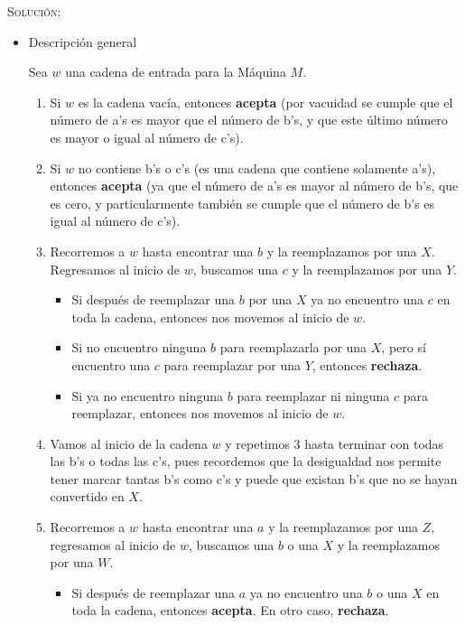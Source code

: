 \documentclass[12pt,letterpaper]{article}
\begin{document}
\begin{enumerate}[a.]
    \textsc{Solución:}
    \begin{itemize}
        \item Descripción general
        
        Sea $w$ una cadena de entrada para la Máquina $M$.
        \begin{enumerate}[1.]
            \item Si $w$ es la cadena vacía, entonces \textbf{acepta} (por vacuidad se cumple que el número de a's es mayor que el número de b's, y que este último número es mayor o igual al número de c's). 
            \item Si $w$ no contiene b's o c's (es una cadena que contiene solamente a's), entonces \textbf{acepta} (ya que el número de 
            a's es mayor al número de b's, que es cero, y particularmente 
            también se cumple que el número de b's es igual al número de c's). 

            \item Recorremos a $w$ hasta encontrar una $b$ y la reemplazamos 
            por una $X$. Regresamos al inicio de $w$, buscamos una $c$ y la 
            reemplazamos por una $Y$. 
            \begin{itemize}
                \item Si después de reemplazar una $b$ por una $X$ ya no 
                encuentro una $c$ en toda la cadena, entonces nos 
                movemos al inicio de $w$. 

                \item Si no encuentro ninguna $b$ para reemplazarla por una 
                $X$, pero sí encuentro una $c$ para reemplazar por una $Y$, 
                entonces \textbf{rechaza}. 

                \item Si ya no encuentro ninguna $b$ para reemplazar ni 
                ninguna $c$ para reemplazar, entonces nos movemos al inicio de 
                $w$.
            \end{itemize} 

            \item Vamos al inicio de la cadena $w$ y repetimos $3$ hasta 
            terminar con todas las b's o todas las c's, pues recordemos que la desigualdad nos permite tener marcar tantas b's como c's y puede que existan b's que no se hayan convertido en $X$.

            \item Recorremos a $w$ hasta encontrar una $a$ y la reemplazamos 
            por una $Z$, regresamos al inicio de $w$, buscamos una $b$ o una 
            $X$ y la reemplazamos por una $W$.
            \begin{itemize}
                \item Si después de reemplazar una $a$ ya no encuentro una $b$ 
                o una $X$ en toda la cadena, entonces \textbf{acepta}. En otro 
                caso, \textbf{rechaza}. 
            \end{itemize} 


\end{enumerate}
\end{itemize}
\end{enumerate}
\end{document}
